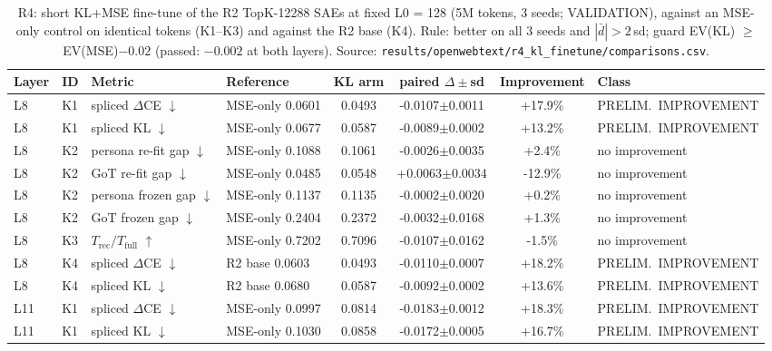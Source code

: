 \begin{table}[t]
\centering
\small
\caption{R4: short KL+MSE fine-tune of the R2 TopK-12288 SAEs at fixed L0 = 128 (5M tokens, 3 seeds; VALIDATION), against an MSE-only control on identical tokens (K1--K3) and against the R2 base (K4). Rule: better on all 3 seeds and $|\bar d| > 2\,$sd; guard EV(KL) $\geq$ EV(MSE)$-0.02$ (passed: $-0.002$ at both layers). Source: \texttt{results/\allowbreak{}openwebtext/\allowbreak{}r4\_kl\_finetune/\allowbreak{}comparisons.csv}.}
\label{tab:r4}
\begin{adjustbox}{max width=\linewidth}
\begin{tabular}{llllcccl}
\toprule
Layer & ID & Metric & Reference & KL arm & paired $\Delta\pm$sd & Improvement & Class \\
\midrule
L8 & K1 & spliced $\Delta$CE $\downarrow$ & MSE-only 0.0601 & 0.0493 & -0.0107$\pm$0.0011 & +17.9\% & PRELIM.\ IMPROVEMENT \\
L8 & K1 & spliced KL $\downarrow$ & MSE-only 0.0677 & 0.0587 & -0.0089$\pm$0.0002 & +13.2\% & PRELIM.\ IMPROVEMENT \\
L8 & K2 & persona re-fit gap $\downarrow$ & MSE-only 0.1088 & 0.1061 & -0.0026$\pm$0.0035 & +2.4\% & no improvement \\
L8 & K2 & GoT re-fit gap $\downarrow$ & MSE-only 0.0485 & 0.0548 & +0.0063$\pm$0.0034 & -12.9\% & no improvement \\
L8 & K2 & persona frozen gap $\downarrow$ & MSE-only 0.1137 & 0.1135 & -0.0002$\pm$0.0020 & +0.2\% & no improvement \\
L8 & K2 & GoT frozen gap $\downarrow$ & MSE-only 0.2404 & 0.2372 & -0.0032$\pm$0.0168 & +1.3\% & no improvement \\
L8 & K3 & $T_{\text{rec}}/T_{\text{full}}$ $\uparrow$ & MSE-only 0.7202 & 0.7096 & -0.0107$\pm$0.0162 & -1.5\% & no improvement \\
L8 & K4 & spliced $\Delta$CE $\downarrow$ & R2 base 0.0603 & 0.0493 & -0.0110$\pm$0.0007 & +18.2\% & PRELIM.\ IMPROVEMENT \\
L8 & K4 & spliced KL $\downarrow$ & R2 base 0.0680 & 0.0587 & -0.0092$\pm$0.0002 & +13.6\% & PRELIM.\ IMPROVEMENT \\
\midrule
L11 & K1 & spliced $\Delta$CE $\downarrow$ & MSE-only 0.0997 & 0.0814 & -0.0183$\pm$0.0012 & +18.3\% & PRELIM.\ IMPROVEMENT \\
L11 & K1 & spliced KL $\downarrow$ & MSE-only 0.1030 & 0.0858 & -0.0172$\pm$0.0005 & +16.7\% & PRELIM.\ IMPROVEMENT \\

\end{tabular}
\end{adjustbox}
\end{table}
